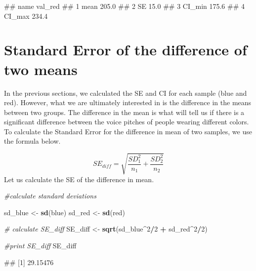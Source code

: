 \documentclass[
]{book}
\newenvironment{Shaded}{\begin{snugshade}}{\end{snugshade}}
\newcommand{\CommentTok}[1]{\textcolor[rgb]{0.56,0.35,0.01}{\textit{#1}}}
\newcommand{\DecValTok}[1]{\textcolor[rgb]{0.00,0.00,0.81}{#1}}
\newcommand{\FunctionTok}[1]{\textcolor[rgb]{0.13,0.29,0.53}{\textbf{#1}}}
\newcommand{\NormalTok}[1]{#1}
\newcommand{\OtherTok}[1]{\textcolor[rgb]{0.56,0.35,0.01}{#1}}
\newcommand{\SpecialCharTok}[1]{\textcolor[rgb]{0.81,0.36,0.00}{\textbf{#1}}}
\begin{document}
\begin{Shaded}
\begin{Highlighting}[]
\NormalTok{\#\#     name val\_red}
\NormalTok{\#\# 1   mean   205.0}
\NormalTok{\#\# 2     SE    15.0}
\NormalTok{\#\# 3 CI\_min   175.6}
\NormalTok{\#\# 4 CI\_max   234.4}
\end{Highlighting}
\end{Shaded}

\section{Standard Error of the difference of two means}\label{standard-error-of-the-difference-of-two-means}

In the previous sections, we calculated the SE and CI for each sample (blue and red). However, what we are ultimately interested in is the difference in the means between two groups. The difference in the mean is what will tell us if there is a significant difference between the voice pitches of people wearing different colors. To calculate the Standard Error for the difference in mean of two samples, we use the formula below.

\[SE_{diff} = \sqrt{\frac{SD_1^2}{n_1}+\frac{SD_2^2}{n_2}}\]
Let us calculate the SE of the difference in mean.

\begin{Shaded}
\begin{Highlighting}[]
\CommentTok{\#calculate standard deviations}

\NormalTok{sd\_blue }\OtherTok{\textless{}{-}} \FunctionTok{sd}\NormalTok{(blue)}
\NormalTok{sd\_red }\OtherTok{\textless{}{-}} \FunctionTok{sd}\NormalTok{(red)}

\CommentTok{\# calculate SE\_diff}
\NormalTok{SE\_diff }\OtherTok{\textless{}{-}} \FunctionTok{sqrt}\NormalTok{(sd\_blue}\SpecialCharTok{\^{}}\DecValTok{2}\SpecialCharTok{/}\DecValTok{2} \SpecialCharTok{+}\NormalTok{ sd\_red}\SpecialCharTok{\^{}}\DecValTok{2}\SpecialCharTok{/}\DecValTok{2}\NormalTok{)}

\CommentTok{\#print SE\_diff}
\NormalTok{SE\_diff}
\end{Highlighting}
\end{Shaded}

\begin{Shaded}
\begin{Highlighting}[]
\NormalTok{\#\# [1] 29.15476}
\end{Highlighting}
\end{Shaded}
\end{document}

